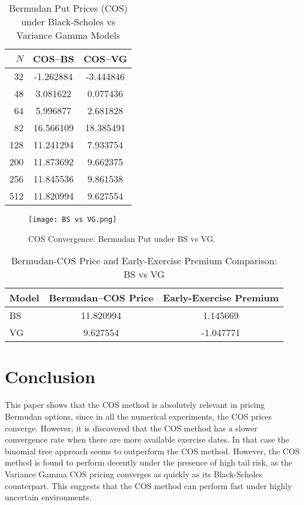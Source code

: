 \documentclass{article}
\begin{document}
\begin{table}[h!]
\centering
\begin{tabular}{rcc}
\toprule
$N$ & COS--BS & COS--VG \\
\midrule
32  &  -1.262884 & -3.444846 \\
48  &   3.081622 &  0.077436 \\
64  &   5.996877 &  2.681828 \\
82  &  16.566109 & 18.385491 \\
128 &  11.241294 &  7.933754 \\
200 &  11.873692 &  9.662375 \\
256 &  11.845536 &  9.861538 \\
512 &  11.820994 &  9.627554 \\
\bottomrule
\end{tabular}
\caption{Bermudan Put Prices (COS) under Black-Scholes vs Variance Gamma Models}
\end{table}


\begin{figure}[h!]
    \centering
    \texttt{[image: BS vs VG.png]}
    \caption{COS Convergence: Bermudan Put under BS vs VG.}
    \label{fig:enter-label}
\end{figure}


\begin{table}[h!]
\centering
\caption{Bermudan-COS Price and Early-Exercise Premium Comparison: BS vs VG}
\begin{tabular}{lcc}
\toprule
Model & Bermudan--COS Price & Early-Exercise Premium \\
\midrule
BS    & 11.820994           & 1.145669 \\
VG    & 9.627554            & -1.047771 \\
\bottomrule
\end{tabular}
\end{table}


\break 
\section{Conclusion}
This paper shows that the COS method is absolutely relevant in pricing Bermudan options, since in all the numerical experiments, the COS prices converge. However, it is discovered that the COS method has a slower convergence rate when there are more available exercise dates. In that case the binomial tree approach seems to outperform the COS method. However, the COS method is found to perform decently under the presence of high tail risk, as the Variance Gamma COS pricing converges as quickly as its Black-Scholes counterpart. This suggests that the COS method can perform fast under highly uncertain environments.
\end{document}
